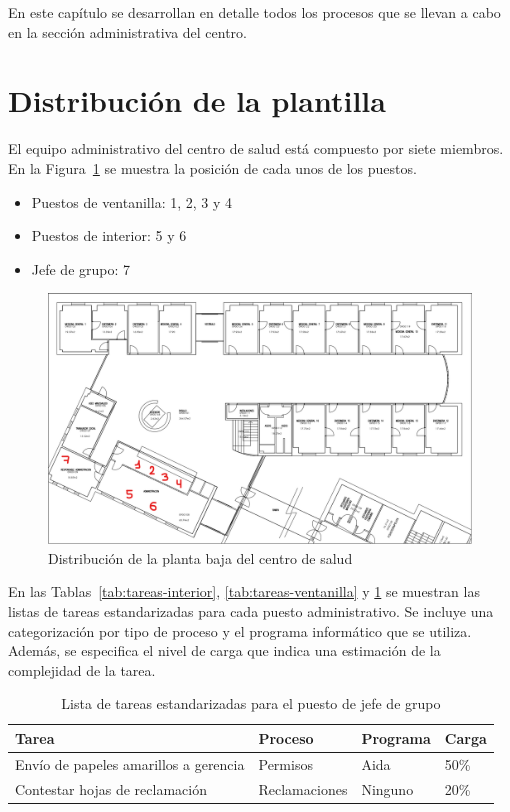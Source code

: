 En este capítulo se desarrollan en detalle todos los procesos que se llevan a cabo en la sección administrativa del centro.

\section{Distribución de la plantilla}

El equipo administrativo del centro de salud está compuesto por siete miembros. En la Figura~\ref{fig:plano-interior} se muestra la posición de cada unos de los puestos.

\begin{itemize}
    \item Puestos de ventanilla: 1, 2, 3 y 4
    \item Puestos de interior: 5 y 6
    \item Jefe de grupo: 7
\end{itemize}

\begin{figure}[H]
    \centering
    \includegraphics[width=\textwidth]{img/plano-interior.png}
    \caption{Distribución de la planta baja del centro de salud}
    \label{fig:plano-interior}
\end{figure}

En las Tablas~\ref{tab:tareas-interior}, \ref{tab:tareas-ventanilla} y \ref{tab:tareas-jefe} se muestran las listas de tareas estandarizadas para cada puesto administrativo.
Se incluye una categorización por tipo de proceso y el programa informático que se utiliza. Además, se especifica el nivel de carga que indica una estimación de la complejidad de la tarea.

\begin{table}
    \centering
    \begin{tabular}{llll}
        \toprule
        Tarea                                   & Proceso       & Programa & Carga \\
        \midrule
        Envío de papeles   amarillos a gerencia & Permisos      & Aida     & 50\%  \\
        Contestar   hojas de reclamación        & Reclamaciones & Ninguno  & 20\%  \\
        \bottomrule
    \end{tabular}
    \caption{Lista de tareas estandarizadas para el puesto de jefe de grupo}
    \label{tab:tareas-jefe}
\end{table}

